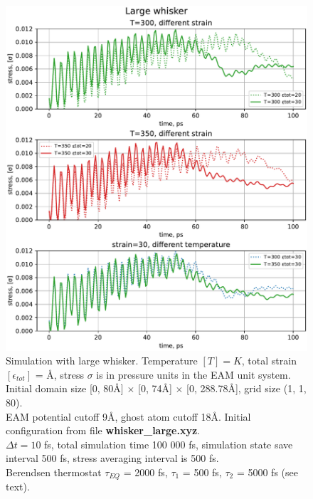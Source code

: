 \documentclass[12pt,a4paper]{article}
\begin{document}
\begin{figure}[h!]
	\centering
	\includegraphics[width=.95\linewidth]{img/milestone09-large.pdf}
	\caption{Simulation with large whisker. Temperature $[T]=K$, total strain $[\epsilon_{tot}]$ = Å, stress $\sigma$ is in pressure units in the EAM unit system.\\
		Initial domain size [0, 80Å] $\times$ [0, 74Å] $\times$ [0, 288.78Å], grid size (1, 1, 80).\\
		EAM potential cutoff 9Å, ghost atom cutoff 18Å. Initial configuration from file {\bf whisker\_large.xyz}.\\
		$\Delta t = 10$ fs, total simulation time 100 000 fs, simulation state save interval 500 fs, stress averaging interval is 500 fs.\\
		Berendsen thermostat $\tau_{EQ}$ = 2000 fs, $\tau_1$ = 500 fs, $\tau_2$ = 5000 fs (see text).
	}
	\label{fig:whisker-large}
\end{figure}
\end{document}
